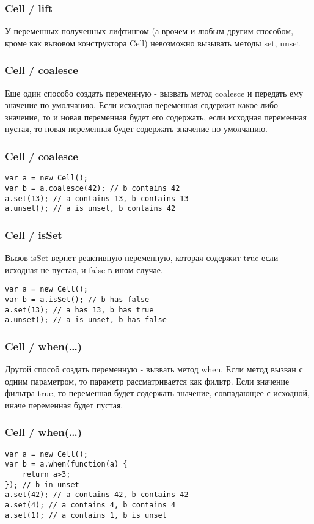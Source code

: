 \documentclass[xetex]{beamer}
\begin{document}
\begin{frame}[fragile]
\frametitle{Cell / lift}
У переменных полученных лифтингом (а врочем и любым другим способом, кроме как вызовом конструктора Cell) невозможно вызывать методы set, unset
\end{frame}


\begin{frame}[fragile]
\frametitle{Cell / coalesce}
Еще один способо создать переменную - вызвать метод coalesce и передать ему значение по умолчанию. Если исходная переменная содержит какое-либо значение, то и новая переменная будет его содержать, если исходная переменная пустая, то новая переменная будет содержать значение по умолчанию.
\end{frame}


\begin{frame}[fragile]
\frametitle{Cell / coalesce}
\begin{lstlisting}
var a = new Cell();
var b = a.coalesce(42); // b contains 42
a.set(13); // a contains 13, b contains 13
a.unset(); // a is unset, b contains 42
\end{lstlisting}
\end{frame}


\begin{frame}[fragile]
\frametitle{Cell / isSet}
Вызов isSet вернет реактивную переменную, которая содержит true если исходная не пустая, и false в ином случае.

\vspace{10mm}
\begin{lstlisting}
var a = new Cell();
var b = a.isSet(); // b has false
a.set(13); // a has 13, b has true
a.unset(); // a is unset, b has false
\end{lstlisting}
\end{frame}


\begin{frame}[fragile]
\frametitle{Cell / when(\dots)}
Другой способ создать переменную - вызвать метод when. Если метод вызван с одним параметром, то параметр рассматривается как фильтр. Если значение фильтра true, то переменная будет содержать значение, совпадающее с исходной, иначе переменная будет пустая.
\end{frame}


\begin{frame}[fragile]
\frametitle{Cell / when(\dots)}
\begin{lstlisting}
var a = new Cell();
var b = a.when(function(a) { 
    return a>3; 
}); // b in unset
a.set(42); // a contains 42, b contains 42
a.set(4); // a contains 4, b contains 4
a.set(1); // a contains 1, b is unset
\end{lstlisting}
\end{frame}
\end{document}
